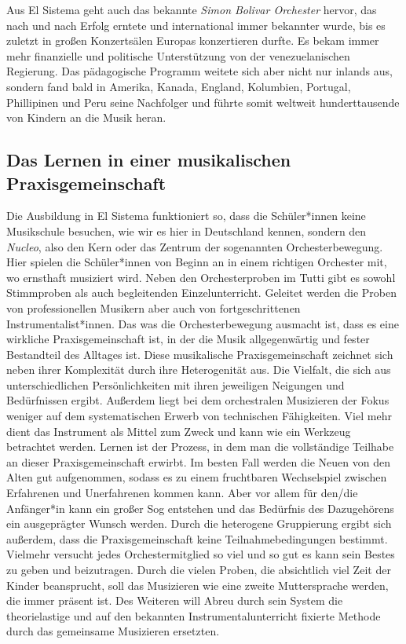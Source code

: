 Aus El Sistema geht auch
das bekannte \emph{Simon Bolivar Orchester} hervor, das nach und nach Erfolg
erntete und international immer bekannter wurde, bis es zuletzt in großen
Konzertsälen Europas konzertieren durfte. Es bekam immer mehr finanzielle und
politische Unterstützung von der venezuelanischen Regierung. Das pädagogische
Programm weitete sich aber nicht nur inlands aus, sondern fand bald in Amerika,
Kanada, England, Kolumbien, Portugal, Phillipinen und Peru seine Nachfolger und
führte somit weltweit hunderttausende von Kindern an die Musik heran. 

\subsection{Das Lernen in einer musikalischen Praxisgemeinschaft}
Die Ausbildung in El Sistema funktioniert so, dass die Schüler*innen keine
Musikschule besuchen, wie wir es hier in Deutschland kennen, sondern den
\emph{Nucleo}, also den Kern oder das Zentrum der sogenannten Orchesterbewegung.
Hier spielen die Schüler*innen von Beginn an in einem richtigen Orchester mit,
wo ernsthaft musiziert wird. Neben den Orchesterproben im Tutti gibt es sowohl
Stimmproben als auch begleitenden Einzelunterricht. Geleitet werden die Proben
von professionellen Musikern aber auch von fortgeschrittenen
Instrumentalist*innen.
\autocite[45]{kaufmann:el_sistema} 
Das was die Orchesterbewegung ausmacht ist, dass es eine wirkliche
Praxisgemeinschaft ist, in der die Musik allgegenwärtig und fester Bestandteil
des Alltages ist. Diese musikalische Praxisgemeinschaft zeichnet sich neben
ihrer Komplexität durch ihre Heterogenität aus. Die Vielfalt, die sich aus
unterschiedlichen Persönlichkeiten mit ihren jeweiligen Neigungen und
Bedürfnissen ergibt. \autocite[161]{roebke_mantilla:vom_wilden_lernen} Außerdem
liegt bei dem orchestralen Musizieren der Fokus weniger auf dem systematischen
Erwerb von technischen Fähigkeiten. Viel mehr dient das Instrument als Mittel
zum Zweck und kann wie ein Werkzeug betrachtet werden. Lernen ist der
Prozess, in dem man die vollständige Teilhabe an dieser Praxisgemeinschaft
erwirbt. Im besten Fall werden die Neuen von den Alten gut aufgenommen, sodass
es zu einem fruchtbaren Wechselspiel zwischen Erfahrenen und Unerfahrenen kommen
kann. Aber vor allem für den/die Anfänger*in kann ein großer Sog entstehen und
das Bedürfnis des Dazugehörens ein ausgeprägter Wunsch werden. Durch die
heterogene Gruppierung ergibt sich außerdem, dass die Praxisgemeinschaft keine
Teilnahmebedingungen bestimmt. Vielmehr versucht jedes Orchestermitglied so viel
und so gut es kann sein Bestes zu geben und beizutragen. Durch die vielen
Proben, die absichtlich viel Zeit der Kinder beansprucht, soll das Musizieren
wie eine zweite Muttersprache werden, die immer präsent ist.
\autocite[162]{kaufmann:el_sistema} Des Weiteren will Abreu durch sein System
die theorielastige und auf den bekannten Instrumentalunterricht fixierte
Methode durch das gemeinsame Musizieren ersetzten. 
\autocite[45]{kaufmann:el_sistema}




